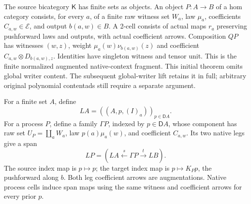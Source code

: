 \documentclass[11pt]{article}
\newcommand{\D}{\mathsf D}\newcommand{\E}{\mathcal E}\newcommand{\C}{\mathcal C}\newcommand{\F}{\operatorname{Fam}}
\begin{document}
The source bicategory $\mathsf K$ has finite sets as objects. An object $P:A\to B$ of a hom category consists, for every $a$, of a finite raw witness set $W_a$, law $\mu_a$, coefficients $C_{a,w}\in\E$, and output $b(a,w)\in B$. A 2-cell consists of actual maps $r_a$ preserving pushforward laws and outputs, with actual coefficient arrows. Composition $Q P$ has witnesses $(w,z)$, weight $\mu_a(w)\nu_{b(a,w)}(z)$ and coefficient $C_{a,w}\otimes D_{b(a,w),z}$. Identities have singleton witness and tensor unit. This is the finite normalized augmented native-context fragment. This initial theorem omits global writer content. The subsequent global-writer lift retains it in full; arbitrary original polynomial contentads still require a separate argument.

For a finite set $A$, define
\[
 L A=((A,p,(I)_a))_{p\in\D A}.
\]
For a process $P$, define a family $\Gamma P$, indexed by $p\in\D A$, whose component has raw set $U_P=\coprod_a W_a$, law $p(a)\mu_a(w)$, and coefficient $C_{a,w}$. Its two native legs give a span
\[
 LP=(LA\xleftarrow{s}\Gamma P\xrightarrow{t}LB).
\]
The source index map is $p\mapsto p$; the target index map is $p\mapsto K_Pp$, the pushforward along $b$. Both leg coefficient arrows are augmentations. Native process cells induce span maps using the same witness and coefficient arrows for every prior $p$.
\end{document}
